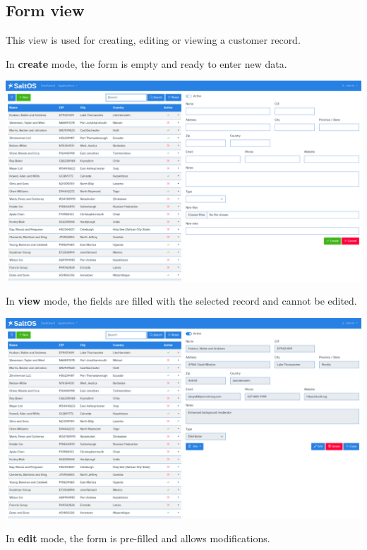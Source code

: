 \documentclass[a4paper]{article}
\begin{document}
\hypertarget{toc49}{}
\subsection{Form view}

This view is used for creating, editing or viewing a customer record.

In \textbf{create} mode, the form is empty and ready to enter new data.

\begin{center}\includegraphics[width=1\textwidth]{../ujest/snaps/test-screenshots-js-screenshots-crm-customers-create-en-us-1-snap.png}\end{center}

In \textbf{view} mode, the fields are filled with the selected record and cannot be edited.

\begin{center}\includegraphics[width=1\textwidth]{../ujest/snaps/test-screenshots-js-screenshots-crm-customers-view-100-en-us-1-snap.png}\end{center}

In \textbf{edit} mode, the form is pre-filled and allows modifications.
\end{document}
